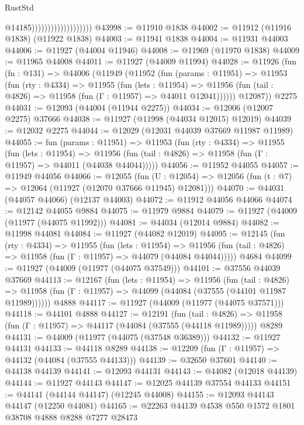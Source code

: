 \begin{lexlean}{RustStd}
\begin{coremodule}
                                          @14185)))))))))))))))))))
@43998 := @11910 @1838
@44002 := @11912 (@11916 @1838) (@11922 @1838)
@44003 := @11941 @1838
@44004 := @11931 @44003
@44006 := @11927 (@44004 @11946)
@44008 := @11969 (@11970 @1838)
@44009 := @11965 @44008
@44011 := @11927 (@44009 @11994)
@44028 := @11926
    (fun (fn : @131) =>
    @44006
      (@11949
        (@11952
          (fun (params : @11951) =>
          @11953
            (fun (rty : @4334) =>
            @11955
              (fun (lets : @11954) =>
              @11956 (fun (tail : @4826) => @11958 (fun (Γ : @11957) => @44011 @12041))))))
        @12087))
    @2275
@44031 := @12093 (@44004 (@11944 @2275))
@44034 := @12006 (@12007 @2275) @37666
@44038 := @11927 (@11998 (@44034 @12015) @12019)
@44039 := @12032 @2275
@44044 := @12029 (@12031 @44039 @37669 @11987 @11989)
@44055 := fun (params : @11951) =>
  @11953
    (fun (rty : @4334) =>
    @11955
      (fun (lets : @11954) =>
      @11956 (fun (tail : @4826) => @11958 (fun (Γ : @11957) => @44011 (@44038 @44044)))))
@44056 := @11952 @44055
@44057 := @11949 @44056
@44066 := @12055
    (fun (U : @12054) => @12056 (fun (t : @7) => @12064 (@11927 (@12070 @37666 @11945) @12081)))
@44070 := @44031 (@44057 @44066) (@12137 @44003)
@44072 := @11912 @44056 @44066
@44074 := @12142 @44055 @9884
@44075 := @11979 @9884
@44079 := @11927 (@44009 (@11977 (@44075 @11992)))
@44081 := @44034 (@12014 @9884)
@44082 := @11998 @44081
@44084 := @11927 (@44082 @12019)
@44095 := @12145
    (fun (rty : @4334) =>
    @11955
      (fun (lets : @11954) =>
      @11956 (fun (tail : @4826) => @11958 (fun (Γ : @11957) => @44079 (@44084 @44044)))))
    @4684
@44099 := @11927 (@44009 (@11977 (@44075 @37549)))
@44101 := @37556 @44039 @37669
@44113 := @12167
    (fun (lets : @11954) =>
    @11956
      (fun (tail : @4826) =>
      @11958 (fun (Γ : @11957) => @44099 (@44084 (@37555 (@44101 @11987 @11989))))))
    @4888
@44117 := @11927 (@44009 (@11977 (@44075 @37571)))
@44118 := @44101 @4888
@44127 := @12191
    (fun (tail : @4826) => @11958 (fun (Γ : @11957) => @44117 (@44084 (@37555 (@44118 @11989)))))
    @8289
@44131 := @44009 (@11977 (@44075 (@37548 @36389)))
@44132 := @11927 @44131
@44133 := @44118 @8289
@44138 := @12209 (fun (Γ : @11957) => @44132 (@44084 (@37555 @44133)))
@44139 := @32650 @37601
@44140 := @44138 @44139
@44141 := @12093 @44131
@44143 := @44082 (@12018 @44139)
@44144 := @11927 @44143
@44147 := @12025 @44139 @37554 @44133
@44151 := @44141 (@44144 @44147) (@12245 @44008)
@44155 := @12093 @44143 @44147 (@12250 @44081)
@44165 := @22263 @44139 @4538 @550 @1572 @1801 @38708 @4888 @8288 @7277 @28473

\end{coremodule}
\end{lexlean}
